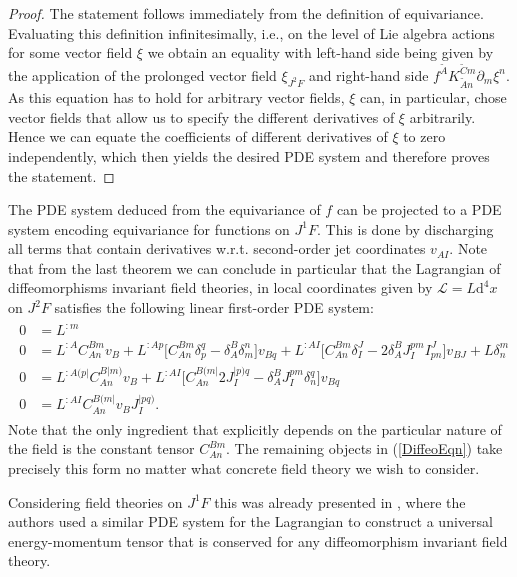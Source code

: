 \documentclass[a4paper,12pt, DIV=14, BCOR=5mm, twoside, headsepline, numbers=noenddot]{scrbook}
\begin{document}
\begin{proof}
The statement follows immediately from the definition of equivariance. Evaluating this definition infinitesimally, i.e., on the level of Lie algebra actions for some vector field $\xi$ we obtain an equality with left-hand side being given by the application of the prolonged vector field $\xi_{J^2F}$ and right-hand side $f^{\tilde{A}}K_{\tilde{A}n}^{\tilde{C}m} \partial_m \xi^n$. As this equation has to hold for arbitrary vector fields, $\xi$ can, in particular, chose vector fields that allow us to specify the different derivatives of $\xi$ arbitrarily. Hence we can equate the coefficients of different derivatives of $\xi$ to zero independently, which then yields the desired PDE system and therefore proves the statement.  
\end{proof}
The PDE system deduced from the equivariance of $f$ can be projected to a PDE system encoding equivariance for functions on $J^1F$. This is done by discharging all terms that contain derivatives w.r.t. second-order jet coordinates $v_{AI}$.  
Note that from the last theorem we can conclude in particular that the Lagrangian of diffeomorphisms invariant field theories, in local coordinates given by $\mathcal{L} = L \mathrm{d}^4x$ on $J^2F$ satisfies the following linear first-order PDE system:  
\begin{align}\label{DiffeoEqn}
\begin{aligned}
    0 &= L^{:m} \\
    0 &= L^{:A} C_{An}^{Bm} v_B + L^{:Ap} \bigl[ C_{An}^{Bm} \delta_p^q - \delta_A^B \delta_m^n \bigr] v_{Bq} + L^{:AI} \bigl[ C_{An}^{Bm} \delta_I^J - 2 \delta_A^B J_I^{pm} I^J_{pn}  \bigr] v_{BJ} + L \delta^m_n \\
    0 &= L^{:A(p\vert}C_{An}^{B \vert m)} v_B + L^{: AI} \bigl[ C_{An}^{B(m\vert} 2 J_I^{\vert p) q} - \delta^B_A J_I ^{pm} \delta_n^q \bigr] v_{Bq} \\
    0 &= L^{:AI} C_{An}^{B(m\vert} v_B J_I^{\vert p q )}.
    \end{aligned}
\end{align}
Note that the only ingredient that explicitly depends on the particular nature of the field is the constant tensor $C^{Bm}_{An}$.
The remaining objects in (\ref{DiffeoEqn}) take precisely this form no matter what concrete field theory we wish to consider.

Considering field theories on $J^1F$ this was already presented in \cite{Gotay1992StressEnergyMomentumTA}, where the authors used a similar PDE system for the Lagrangian to construct a universal energy-momentum tensor that is conserved for any diffeomorphism invariant field theory.
\end{document}
